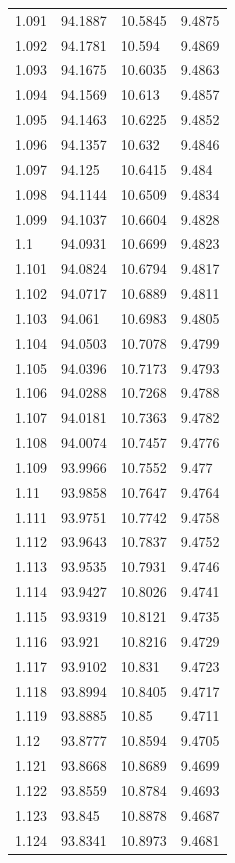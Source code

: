 \begin{tabular}{llll}
1.091 & 94.1887 & 10.5845 & 9.4875 \\
1.092 & 94.1781 & 10.594 & 9.4869 \\
1.093 & 94.1675 & 10.6035 & 9.4863 \\
1.094 & 94.1569 & 10.613 & 9.4857 \\
1.095 & 94.1463 & 10.6225 & 9.4852 \\
1.096 & 94.1357 & 10.632 & 9.4846 \\
1.097 & 94.125 & 10.6415 & 9.484 \\
1.098 & 94.1144 & 10.6509 & 9.4834 \\
1.099 & 94.1037 & 10.6604 & 9.4828 \\
1.1 & 94.0931 & 10.6699 & 9.4823 \\
1.101 & 94.0824 & 10.6794 & 9.4817 \\
1.102 & 94.0717 & 10.6889 & 9.4811 \\
1.103 & 94.061 & 10.6983 & 9.4805 \\
1.104 & 94.0503 & 10.7078 & 9.4799 \\
1.105 & 94.0396 & 10.7173 & 9.4793 \\
1.106 & 94.0288 & 10.7268 & 9.4788 \\
1.107 & 94.0181 & 10.7363 & 9.4782 \\
1.108 & 94.0074 & 10.7457 & 9.4776 \\
1.109 & 93.9966 & 10.7552 & 9.477 \\
1.11 & 93.9858 & 10.7647 & 9.4764 \\
1.111 & 93.9751 & 10.7742 & 9.4758 \\
1.112 & 93.9643 & 10.7837 & 9.4752 \\
1.113 & 93.9535 & 10.7931 & 9.4746 \\
1.114 & 93.9427 & 10.8026 & 9.4741 \\
1.115 & 93.9319 & 10.8121 & 9.4735 \\
1.116 & 93.921 & 10.8216 & 9.4729 \\
1.117 & 93.9102 & 10.831 & 9.4723 \\
1.118 & 93.8994 & 10.8405 & 9.4717 \\
1.119 & 93.8885 & 10.85 & 9.4711 \\
1.12 & 93.8777 & 10.8594 & 9.4705 \\
1.121 & 93.8668 & 10.8689 & 9.4699 \\
1.122 & 93.8559 & 10.8784 & 9.4693 \\
1.123 & 93.845 & 10.8878 & 9.4687 \\
1.124 & 93.8341 & 10.8973 & 9.4681 \\

\end{tabular}
